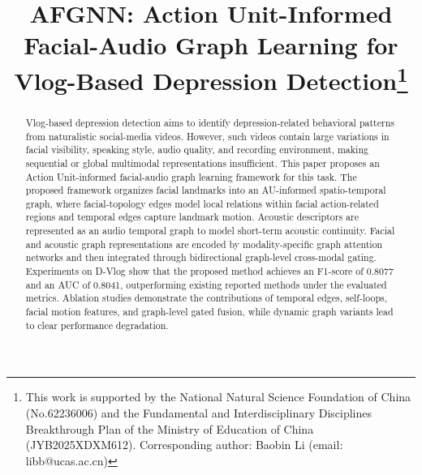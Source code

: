 \documentclass[conference]{IEEEtran}
\begin{document}
\title{AFGNN: Action Unit-Informed Facial-Audio Graph Learning for Vlog-Based Depression Detection\thanks{This work is supported by the National Natural Science Foundation of China (No.62236006) and the Fundamental and Interdisciplinary Disciplines Breakthrough Plan of the Ministry of Education of China (JYB2025XDXM612). Corresponding author: Baobin Li (email: libb@ucas.ac.cn)}}

\author{


}

\maketitle
\begin{abstract}
Vlog-based depression detection aims to identify depression-related behavioral patterns from naturalistic social-media videos. However, such videos contain large variations in facial visibility, speaking style, audio quality, and recording environment, making sequential or global multimodal representations insufficient. This paper proposes an Action Unit-informed facial-audio graph learning framework for this task. The proposed framework organizes facial landmarks into an AU-informed spatio-temporal graph, where facial-topology edges model local relations within facial action-related regions and temporal edges capture landmark motion. Acoustic descriptors are represented as an audio temporal graph to model short-term acoustic continuity. Facial and acoustic graph representations are encoded by modality-specific graph attention networks and then integrated through bidirectional graph-level cross-modal gating. Experiments on D-Vlog show that the proposed method achieves an F1-score of 0.8077 and an AUC of 0.8041, outperforming existing reported methods under the evaluated metrics. Ablation studies demonstrate the contributions of temporal edges, self-loops, facial motion features, and graph-level gated fusion, while dynamic graph variants lead to clear performance degradation.
\end{abstract}
\end{document}
